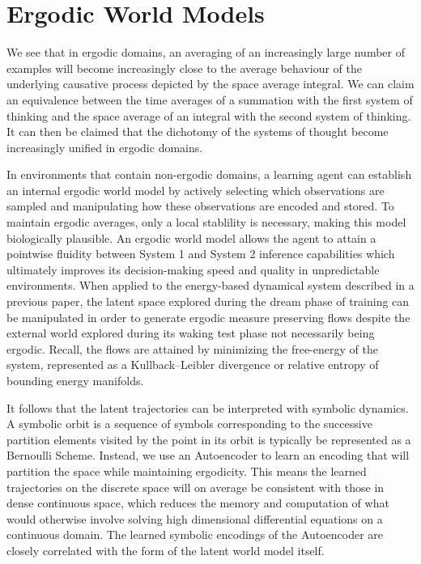 \documentclass{article}
\begin{document}
\section{Ergodic World Models}


We see that in ergodic domains, an averaging of an increasingly large number of examples will become increasingly close to the average behaviour of the underlying causative process depicted by the space average integral. We can claim an equivalence between the time averages of a summation with the first system of thinking and the space average of an integral with the second system of thinking. It can then be claimed that the dichotomy of the systems of thought become increasingly unified in ergodic domains.

In environments that contain non-ergodic domains, a learning agent can establish an internal ergodic world model by actively selecting which observations are sampled and manipulating how these observations are encoded and stored. To maintain ergodic averages, only a local stablility is necessary, making this model biologically plausible. An ergodic world model allows the agent to attain a pointwise fluidity between System 1 and System 2 inference capabilities which ultimately improves its decision-making speed and quality in unpredictable environments. When applied to the energy-based dynamical system described in a previous paper, the latent space explored during the dream phase of training can be manipulated in order to generate ergodic measure preserving flows despite the external world explored during its waking test phase not necessarily being ergodic. Recall, the flows are attained by minimizing the free-energy of the system, represented as a Kullback–Leibler divergence or relative entropy of bounding energy manifolds. 

It follows that the latent trajectories can be interpreted with symbolic dynamics. A symbolic orbit is a sequence of symbols corresponding to the successive partition elements visited by the point in its orbit is typically be represented as a Bernoulli Scheme. Instead, we use an Autoencoder to learn an encoding that will partition the space while maintaining ergodicity. This means the learned trajectories on the discrete space will on average be consistent with those in dense continuous space, which reduces the memory and computation of what would otherwise involve solving high dimensional differential equations on a continuous domain. The learned symbolic encodings of the Autoencoder are closely correlated with the form of the latent world model itself.
\end{document}
